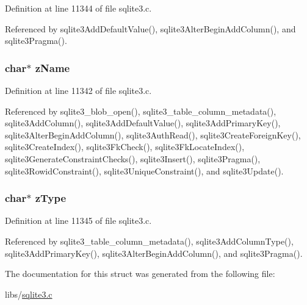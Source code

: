 Definition at line 11344 of file sqlite3.\+c.



Referenced by sqlite3\+Add\+Default\+Value(), sqlite3\+Alter\+Begin\+Add\+Column(), and sqlite3\+Pragma().

\hypertarget{struct_column_a661118d86ac4127d40bf3be78d92117d}{}
\subsubsection[{z\+Name}]{\setlength{\rightskip}{0pt plus 5cm}char$\ast$ z\+Name}\label{struct_column_a661118d86ac4127d40bf3be78d92117d}


Definition at line 11342 of file sqlite3.\+c.



Referenced by sqlite3\+\_\+blob\+\_\+open(), sqlite3\+\_\+table\+\_\+column\+\_\+metadata(), sqlite3\+Add\+Column(), sqlite3\+Add\+Default\+Value(), sqlite3\+Add\+Primary\+Key(), sqlite3\+Alter\+Begin\+Add\+Column(), sqlite3\+Auth\+Read(), sqlite3\+Create\+Foreign\+Key(), sqlite3\+Create\+Index(), sqlite3\+Fk\+Check(), sqlite3\+Fk\+Locate\+Index(), sqlite3\+Generate\+Constraint\+Checks(), sqlite3\+Insert(), sqlite3\+Pragma(), sqlite3\+Rowid\+Constraint(), sqlite3\+Unique\+Constraint(), and sqlite3\+Update().

\hypertarget{struct_column_a9c37cde19d475c63f750798ff6cdeeb1}{}
\subsubsection[{z\+Type}]{\setlength{\rightskip}{0pt plus 5cm}char$\ast$ z\+Type}\label{struct_column_a9c37cde19d475c63f750798ff6cdeeb1}


Definition at line 11345 of file sqlite3.\+c.



Referenced by sqlite3\+\_\+table\+\_\+column\+\_\+metadata(), sqlite3\+Add\+Column\+Type(), sqlite3\+Add\+Primary\+Key(), sqlite3\+Alter\+Begin\+Add\+Column(), and sqlite3\+Pragma().



The documentation for this struct was generated from the following file\+:\begin{DoxyCompactItemize}
\item 
libs/\hyperlink{sqlite3_8c}{sqlite3.\+c}\end{DoxyCompactItemize}
